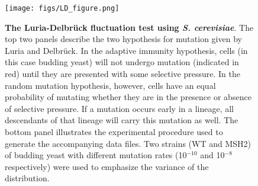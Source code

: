 \documentclass[letterpaper, 12pt]{article}
\begin{document}
\begin{figure}
	\centerline{\texttt{[image: figs/LD\_figure.png]}}
	\caption{\small \textbf{The Luria-Delbr\"{u}ck fluctuation test using
	{\em S. cerevisiae}}. The top two panels describe the two hypothesis for
	mutation given by Luria and Delbr\"{u}ck. In the adaptive immunity
hypothesis, cells (in this case budding yeast) will not undergo mutation
(indicated in red) until they are presented with some selective pressure. In the
random mutation hypothesis, however, cells have an equal probability of mutating
whether they are in the presence or absence of selective pressure. If a mutation
occurs early in a lineage, all descendants of that lineage will carry this
mutation as well. The bottom panel illustrates the experimental procedure used
to generate the accompanying data files. Two strains (WT and MSH2) of budding yeast with
different mutation rates (10$^{-10}$ and 10$^{-8}$ respectively) were used to
emphasize the variance of the distribution.}
\end{figure}
\end{document}
